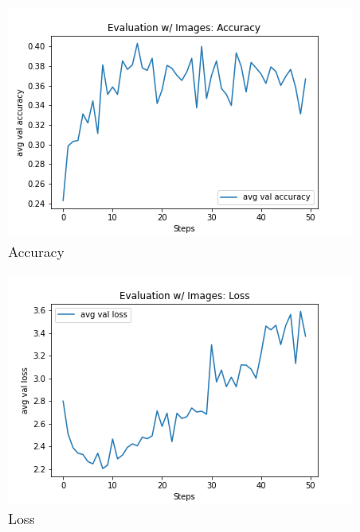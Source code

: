 \begin{figure}[H]
     \centering
     \begin{subfigure}[b]{0.3\textwidth}
         \centering
         \includegraphics[width=\textwidth]{./figure/results/baseline_and_blindfolding/images/avg val accuracy.png}
         \caption{Accuracy} %
         \label{fig:baseline_accuracy}
     \end{subfigure}
     \hfill
          \begin{subfigure}[b]{0.3\textwidth}
         \centering
         \includegraphics[width=\textwidth]{./figure/results/baseline_and_blindfolding/images/avg val loss.png}
         \caption{Loss}
         \label{fig:baseline_loss}
     \end{subfigure}
     \hfill
     \begin{subfigure}[b]{0.3\textwidth}
         \centering

\end{subfigure}
\end{figure}
